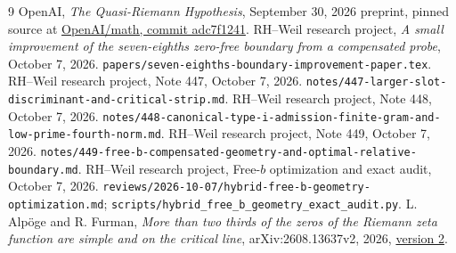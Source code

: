 \documentclass[11pt,a4paper]{article}
\theoremstyle{definition}
\newcommand{\src}[1]{\nolinkurl{#1}}
\begin{document}
\begin{thebibliography}{9}
OpenAI, \emph{The Quasi-Riemann Hypothesis},
September 30, 2026 preprint, pinned source at
\href{https://github.com/openai/math/blob/adc7f1241b42e322a6451854ab7e4b4c146bf78a/preprints/The-Quasi-Riemann-Hypothesis-September-30-2026/build/paper.tex}
{OpenAI/math, commit adc7f1241}.
RH--Weil research project,
\emph{A small improvement of the seven-eighths zero-free boundary
from a compensated probe}, October 7, 2026.
\src{papers/seven-eighths-boundary-improvement-paper.tex}.
RH--Weil research project, Note 447, October 7, 2026.
\src{notes/447-larger-slot-discriminant-and-critical-strip.md}.
RH--Weil research project, Note 448, October 7, 2026.
\src{notes/448-canonical-type-i-admission-finite-gram-and-low-prime-fourth-norm.md}.
RH--Weil research project, Note 449, October 7, 2026.
\src{notes/449-free-b-compensated-geometry-and-optimal-relative-boundary.md}.
RH--Weil research project, Free-$b$ optimization and exact audit,
October 7, 2026.
\src{reviews/2026-10-07/hybrid-free-b-geometry-optimization.md};
\src{scripts/hybrid_free_b_geometry_exact_audit.py}.
L. Alp\"oge and R. Furman,
\emph{More than two thirds of the zeros of the Riemann zeta function
are simple and on the critical line}, arXiv:2608.13637v2, 2026,
\href{https://arxiv.org/html/2608.13637v2}{version 2}.
\end{thebibliography}
\end{document}
